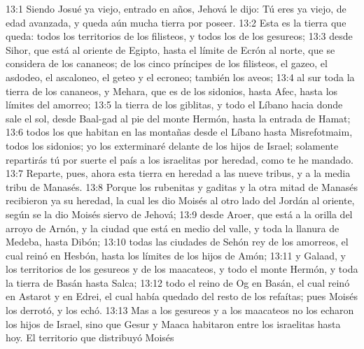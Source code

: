 13:1 Siendo Josué ya viejo, entrado en años, Jehová le dijo: Tú eres ya viejo, de edad avanzada, y queda aún mucha tierra por poseer.  
13:2 Esta es la tierra que queda: todos los territorios de los filisteos, y todos los de los gesureos;  
13:3 desde Sihor, que está al oriente de Egipto, hasta el límite de Ecrón al norte, que se considera de los cananeos; de los cinco príncipes de los filisteos, el gazeo, el asdodeo, el ascaloneo, el geteo y el ecroneo; también los aveos;  
13:4 al sur toda la tierra de los cananeos, y Mehara, que es de los sidonios, hasta Afec, hasta los límites del amorreo;  
13:5 la tierra de los giblitas, y todo el Líbano hacia donde sale el sol, desde Baal-gad al pie del monte Hermón, hasta la entrada de Hamat;  
13:6 todos los que habitan en las montañas desde el Líbano hasta Misrefotmaim, todos los sidonios; yo los exterminaré delante de los hijos de Israel; solamente repartirás tú por suerte el país a los israelitas por heredad, como te he mandado.  
13:7 Reparte, pues, ahora esta tierra en heredad a las nueve tribus, y a la media tribu de Manasés.  
13:8 Porque los rubenitas y gaditas y la otra mitad de Manasés recibieron ya su heredad, la cual les dio Moisés al otro lado del Jordán al oriente, según se la dio Moisés siervo de Jehová;  
13:9 desde Aroer, que está a la orilla del arroyo de Arnón, y la ciudad que está en medio del valle, y toda la llanura de Medeba, hasta Dibón;  
13:10 todas las ciudades de Sehón rey de los amorreos, el cual reinó en Hesbón, hasta los límites de los hijos de Amón;  
13:11 y Galaad, y los territorios de los gesureos y de los maacateos, y todo el monte Hermón, y toda la tierra de Basán hasta Salca;  
13:12 todo el reino de Og en Basán, el cual reinó en Astarot y en Edrei, el cual había quedado del resto de los refaítas; pues Moisés los derrotó, y los echó.  
13:13 Mas a los gesureos y a los maacateos no los echaron los hijos de Israel, sino que Gesur y Maaca habitaron entre los israelitas hasta hoy.  
El territorio que distribuyó Moisés  

